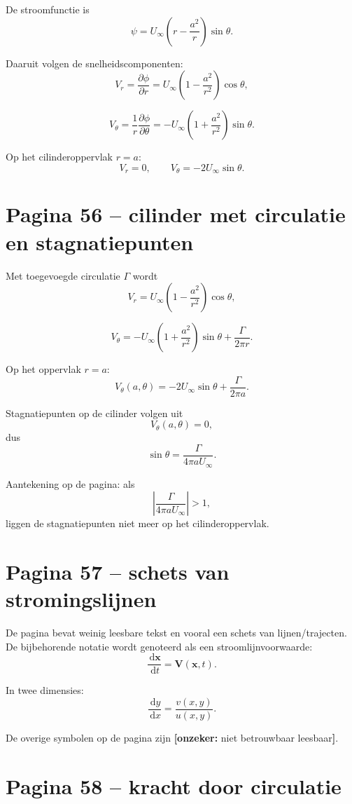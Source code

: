 \documentclass[11pt,a4paper]{article}
\newcommand{\onzeker}[1]{\ifmmode\text{\color{red!70!black}\bfseries[onzeker]}\else\textcolor{red!70!black}{\textbf{[onzeker:} #1\textbf{]}}\fi}
\newcommand{\dd}{\,\mathrm{d}}
\newcommand{\V}{\mathbf{V}}
\newcommand{\xvec}{\mathbf{x}}
\begin{document}
De stroomfunctie is
$$
\psi
=
U_\infty
\left(
r-\frac{a^2}{r}
\right)\sin\theta.
$$

Daaruit volgen de snelheidscomponenten:
$$
V_r
=
\frac{\partial \phi}{\partial r}
=
U_\infty
\left(
1-\frac{a^2}{r^2}
\right)\cos\theta,
$$

$$
V_\theta
=
\frac{1}{r}\frac{\partial \phi}{\partial \theta}
=
-
U_\infty
\left(
1+\frac{a^2}{r^2}
\right)\sin\theta.
$$

Op het cilinderoppervlak $r=a$:
$$
V_r=0,
\qquad
V_\theta=-2U_\infty\sin\theta.
$$

\section*{Pagina 56 -- cilinder met circulatie en stagnatiepunten}

Met toegevoegde circulatie $\Gamma$ wordt
$$
V_r
=
U_\infty
\left(
1-\frac{a^2}{r^2}
\right)\cos\theta,
$$

$$
V_\theta
=
-
U_\infty
\left(
1+\frac{a^2}{r^2}
\right)\sin\theta
+
\frac{\Gamma}{2\pi r}.
$$

Op het oppervlak $r=a$:
$$
V_\theta(a,\theta)
=
-2U_\infty\sin\theta
+
\frac{\Gamma}{2\pi a}.
$$

Stagnatiepunten op de cilinder volgen uit
$$
V_\theta(a,\theta)=0,
$$
dus
$$
\sin\theta
=
\frac{\Gamma}{4\pi a U_\infty}.
$$

Aantekening op de pagina: als
$$
\left|\frac{\Gamma}{4\pi a U_\infty}\right|>1,
$$
liggen de stagnatiepunten niet meer op het cilinderoppervlak.

\section*{Pagina 57 -- schets van stromingslijnen}

De pagina bevat weinig leesbare tekst en vooral een schets van lijnen/trajecten. De bijbehorende notatie wordt genoteerd als een stroomlijnvoorwaarde:
$$
\frac{\dd \xvec}{\dd t}=\V\left(\xvec,t\right).
$$

In twee dimensies:
$$
\frac{\dd y}{\dd x}
=
\frac{v\left(x,y\right)}{u\left(x,y\right)}.
$$

De overige symbolen op de pagina zijn \onzeker{niet betrouwbaar leesbaar}.

\section*{Pagina 58 -- kracht door circulatie}
\end{document}
